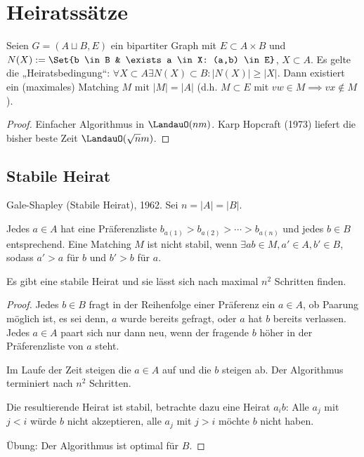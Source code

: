 \chapter{Heiratssätze}


\begin{st}
    Seien $G = (A \sqcup B, E)$ ein bipartiter Graph mit $E \subset A \times B$ und $N(X) := \Set{b \in B & \exists a \in X: (a,b) \in E}$, $X \subset A$.
    Es gelte die „Heiratsbedingung“:
    \begin{math}
        \forall X \subset A \exists N(X) \subset B : |N(X)| \ge |X|.
    \end{math}
    Dann existiert ein (maximales) Matching $M$ mit $|M| = |A|$ (d.h. $M \subset E$ mit $vw \in M \implies vx \not\in M$).
    \begin{proof}
        Einfacher Algorithmus in $\LandauO(nm)$.
        Karp Hopcraft (1973) liefert die bisher beste Zeit $\LandauO(\sqrt{n} m)$.
    \end{proof}
\end{st}

\section{Stabile Heirat}

Gale-Shapley (Stabile Heirat), 1962.
Sei $n = |A| = |B|$.

Jedes $a \in A$ hat eine Präferenzliste $b_{a(1)} > b_{a(2)} > \dotsb > b_{a(n)}$ und jedes $b \in B$ entsprechend.
Eine Matching $M$ ist nicht stabil, wenn $\exists ab \in M, a' \in A, b' \in B$, sodass $a' > a$ für $b$ und $b' > b$ für $a$.

\begin{st}
    Es gibt eine stabile Heirat und sie lässt sich nach maximal $n^2$ Schritten finden.
    \begin{proof}
        Jedes $b \in B$ fragt in der Reihenfolge einer Präferenz ein $a \in A$, ob Paarung möglich ist, es sei denn, $a$ wurde bereits gefragt, oder $a$ hat $b$ bereits verlassen.
        Jedes $a \in A$ paart sich nur dann neu, wenn der fragende $b$ höher in der Präferenzliste von $a$ steht.

        Im Laufe der Zeit steigen die $a \in A$ auf und die $b$ steigen ab.
        Der Algorithmus terminiert nach $n^2$ Schritten.

        Die resultierende Heirat ist stabil, betrachte dazu eine Heirat $a_i b$:
        Alle $a_j$ mit $j < i$ würde $b$ nicht akzeptieren, alle $a_j$ mit $j > i$ möchte $b$ nicht haben.

        Übung: Der Algorithmus ist optimal für $B$.
    \end{proof}
\end{st}

